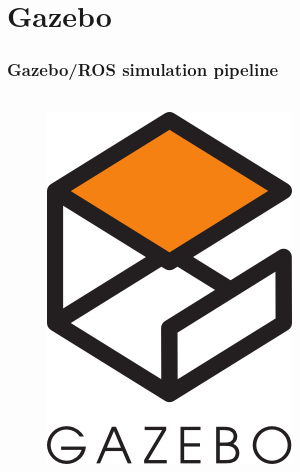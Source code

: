 \documentclass[aspectratio=169,9pt]{beamer}
\begin{document}




\section{Gazebo}

\begin{frame}

  \frametitle{Gazebo/ROS simulation pipeline}

  \begin{columns}[c]

    \begin{figure}
      \centering
      \includegraphics[width=0.5\textheight]{./fig/gazebo_logo.png}
    \end{figure}


  \end{columns}

\end{frame}
\end{document}
